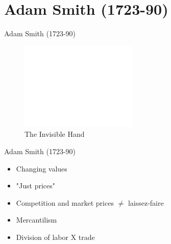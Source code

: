 \documentclass{beamer}
\begin{document}
\section{Adam Smith (1723-90)}

\begin{frame}{}

\end{frame}{}


\begin{frame}{Adam Smith (1723-90)}
    \begin{figure}
        \centering
        \includegraphics[width=0.5\textwidth, height=0.5\textheight]{../img/invisiblehand2.jpg}
        \caption{The Invisible Hand}
    \end{figure}
\end{frame}{}

\begin{frame}{Adam Smith (1723-90)}
    \begin{itemize}[<+- | alert@+>]
    \item Changing values 
    \item "Just prices"
    \item Competition and market prices $\neq$ laissez-faire
    \item Mercantilism
    \item Division of labor X trade
    \end{itemize}
\end{frame}{}
\end{document}

